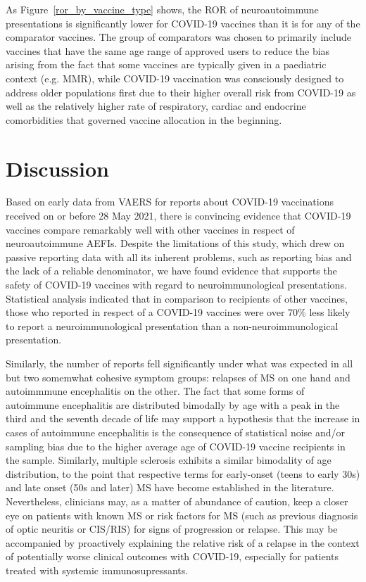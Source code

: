 \documentclass[idr,communication,submit,oneauthor,pdftex]{Definitions/mdpi}
\begin{document}
As Figure~\ref{ror_by_vaccine_type} shows, the ROR of neuroautoimmune presentations is significantly lower for COVID-19
vaccines than it is for any of the comparator vaccines. The group of comparators was chosen to primarily include
vaccines that have the same age range of approved users to reduce the bias arising from the fact that some vaccines
are typically given in a paediatric context (e.g. MMR), while COVID-19 vaccination was consciously designed to
address older populations first due to their higher overall risk from COVID-19 as well as the relatively higher rate
of respiratory, cardiac and endocrine comorbidities that governed vaccine allocation in the beginning.

\section{Discussion}

Based on early data from VAERS for reports about COVID-19 vaccinations received on or before 28 May 2021, there
is convincing evidence that COVID-19 vaccines compare remarkably well with other vaccines in respect of
neuroautoimmune AEFIs. Despite the limitations of this study, which drew on passive reporting data with all its
inherent problems, such as reporting bias and the lack of a reliable denominator, we have found evidence that supports
the safety of COVID-19 vaccines with regard to neuroimmunological presentations. Statistical analysis indicated that in
comparison to recipients of other vaccines, those who reported in respect of a COVID-19 vaccines were over 70\% less
likely to report a neuroimmunological presentation than a non-neuroimmunological presentation.

Similarly, the number of reports fell significantly under what was expected in all but two somemwhat cohesive symptom
groups: relapses of MS on one hand and autoimmmune encephalitis on the other. The fact that some forms of autoimmune
encephalitis are distributed bimodally by age with a peak in the third and the seventh decade of life may support a
hypothesis that the increase in cases of autoimmune encephalitis is the consequence of statistical noise and/or
sampling bias due to the higher average age of COVID-19 vaccine recipients in the sample.\cite{shan2021neuronal}
Similarly, multiple sclerosis exhibits a similar bimodality of age distribution, to the point that respective terms
for early-onset (teens to early 30s) and late onset (50s and later) MS have become established in the
literature.\cite{kis2008clinical} Nevertheless, clinicians may, as a matter of abundance of caution, keep a closer eye
on patients with known MS or risk factors for MS (such as previous diagnosis of optic neuritis or CIS/RIS) for signs
of progression or relapse. This may be accompanied by proactively explaining the relative risk of a relapse in the
context of potentially worse clinical outcomes with COVID-19, especially for patients treated with systemic immunosupressants.
\end{document}
